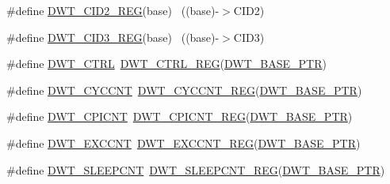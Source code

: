 \begin{DoxyCompactItemize}
\#define \hyperlink{group___d_w_t___register___accessor___macros_gab6a7a7788e8fdbbe47ac13383064a1e8}{D\+W\+T\+\_\+\+C\+I\+D2\+\_\+\+R\+EG}(base)                                          ~((base)-\/$>$C\+I\+D2)
\item 
\#define \hyperlink{group___d_w_t___register___accessor___macros_ga7a29c7e2d907c373f1ffa34877e83852}{D\+W\+T\+\_\+\+C\+I\+D3\+\_\+\+R\+EG}(base)                                          ~((base)-\/$>$C\+I\+D3)
\item 
\#define \hyperlink{group___d_w_t___register___accessor___macros_ga90b9ebedff8635727698afd2fa84b90a}{D\+W\+T\+\_\+\+C\+T\+RL}~\hyperlink{group___d_w_t___register___accessor___macros_ga805e8330d1aa986d534abe1eed2614df}{D\+W\+T\+\_\+\+C\+T\+R\+L\+\_\+\+R\+EG}(\hyperlink{group___d_w_t___peripheral_ga3b46dfb2ea7946c6938028d879c82cb1}{D\+W\+T\+\_\+\+B\+A\+S\+E\+\_\+\+P\+TR})
\item 
\#define \hyperlink{group___d_w_t___register___accessor___macros_ga01aca3c6bc0f9d7b0f524442ded3f37c}{D\+W\+T\+\_\+\+C\+Y\+C\+C\+NT}~\hyperlink{group___d_w_t___register___accessor___macros_ga745c3ae737eb0e94dde4b3e1178920af}{D\+W\+T\+\_\+\+C\+Y\+C\+C\+N\+T\+\_\+\+R\+EG}(\hyperlink{group___d_w_t___peripheral_ga3b46dfb2ea7946c6938028d879c82cb1}{D\+W\+T\+\_\+\+B\+A\+S\+E\+\_\+\+P\+TR})
\item 
\#define \hyperlink{group___d_w_t___register___accessor___macros_ga9e017822b9666f9bed09efcb9a5542a5}{D\+W\+T\+\_\+\+C\+P\+I\+C\+NT}~\hyperlink{group___d_w_t___register___accessor___macros_ga57a7caeb5e0d4038c88b5adb8a31ac4e}{D\+W\+T\+\_\+\+C\+P\+I\+C\+N\+T\+\_\+\+R\+EG}(\hyperlink{group___d_w_t___peripheral_ga3b46dfb2ea7946c6938028d879c82cb1}{D\+W\+T\+\_\+\+B\+A\+S\+E\+\_\+\+P\+TR})
\item 
\#define \hyperlink{group___d_w_t___register___accessor___macros_ga3809efa12492d5b2b350483c2ec5cd85}{D\+W\+T\+\_\+\+E\+X\+C\+C\+NT}~\hyperlink{group___d_w_t___register___accessor___macros_gacfd254c94211e8165496d8c22a02b996}{D\+W\+T\+\_\+\+E\+X\+C\+C\+N\+T\+\_\+\+R\+EG}(\hyperlink{group___d_w_t___peripheral_ga3b46dfb2ea7946c6938028d879c82cb1}{D\+W\+T\+\_\+\+B\+A\+S\+E\+\_\+\+P\+TR})
\item 
\#define \hyperlink{group___d_w_t___register___accessor___macros_ga1c4f724ecf53fcc9a7379a8c5f9b40e7}{D\+W\+T\+\_\+\+S\+L\+E\+E\+P\+C\+NT}~\hyperlink{group___d_w_t___register___accessor___macros_gad4f054164e8c0594edcc3672d3122903}{D\+W\+T\+\_\+\+S\+L\+E\+E\+P\+C\+N\+T\+\_\+\+R\+EG}(\hyperlink{group___d_w_t___peripheral_ga3b46dfb2ea7946c6938028d879c82cb1}{D\+W\+T\+\_\+\+B\+A\+S\+E\+\_\+\+P\+TR})

\end{DoxyCompactItemize}
